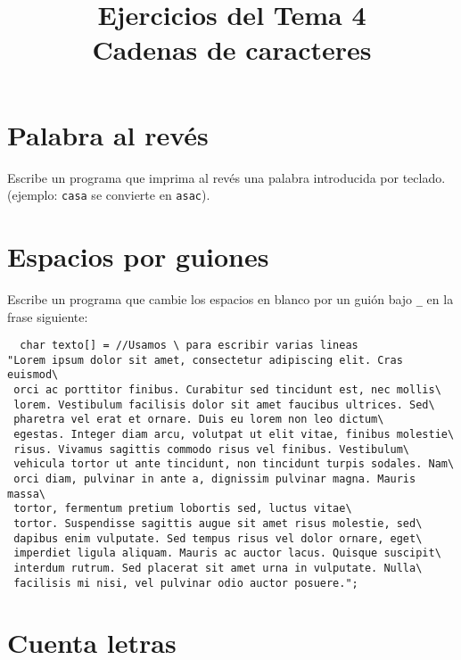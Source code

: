 \documentclass[a4paper]{article}
\date{}
\title{Ejercicios del Tema 4\\\medskip
\large Cadenas de caracteres}
\begin{document}
\maketitle

\section{Palabra al revés}
\label{sec:org549883f}

Escribe un programa que imprima al revés una palabra introducida por teclado. (ejemplo: \texttt{casa} se convierte en \texttt{asac}).

\section{Espacios por guiones}
\label{sec:org4fed0ca}

Escribe	un programa que cambie los espacios en blanco por un guión bajo \texttt{\_} en la frase siguiente:

\lstset{language=C,label= ,caption= ,captionpos=b,numbers=none}
\begin{lstlisting}
  char texto[] = //Usamos \ para escribir varias lineas
"Lorem ipsum dolor sit amet, consectetur adipiscing elit. Cras euismod\
 orci ac porttitor finibus. Curabitur sed tincidunt est, nec mollis\
 lorem. Vestibulum facilisis dolor sit amet faucibus ultrices. Sed\
 pharetra vel erat et ornare. Duis eu lorem non leo dictum\
 egestas. Integer diam arcu, volutpat ut elit vitae, finibus molestie\
 risus. Vivamus sagittis commodo risus vel finibus. Vestibulum\
 vehicula tortor ut ante tincidunt, non tincidunt turpis sodales. Nam\
 orci diam, pulvinar in ante a, dignissim pulvinar magna. Mauris massa\
 tortor, fermentum pretium lobortis sed, luctus vitae\
 tortor. Suspendisse sagittis augue sit amet risus molestie, sed\
 dapibus enim vulputate. Sed tempus risus vel dolor ornare, eget\
 imperdiet ligula aliquam. Mauris ac auctor lacus. Quisque suscipit\
 interdum rutrum. Sed placerat sit amet urna in vulputate. Nulla\
 facilisis mi nisi, vel pulvinar odio auctor posuere.";
\end{lstlisting}

\section{Cuenta letras}
\label{sec:org6ec4fa1}
\end{document}
